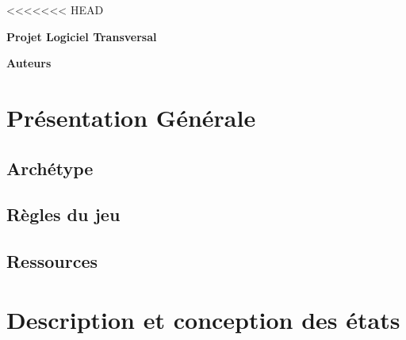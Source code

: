 \documentclass[a4paper,12pt]{article}
\begin{document}
<<<<<<< HEAD
\thispagestyle{empty}

\begin{titlepage}

\vspace*{2cm}

\begin{center}\textbf{\Huge Projet Logiciel Transversal}\end{center}{\Large \par}

\begin{center}\textbf{\large Auteurs}\end{center}{\large \par}

\vspace{2cm}


\clearpage

{\small
\tableofcontents
}

\end{titlepage}

\clearpage
\section{Présentation Générale}

\subsection{Archétype}


\subsection{Règles du jeu}

\subsection{Ressources}



\clearpage
\section{Description et conception des états}
\end{document}
